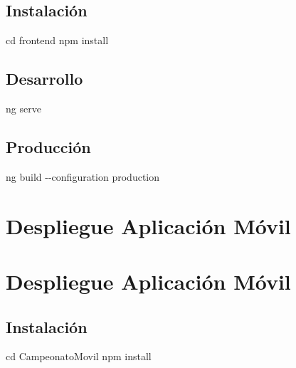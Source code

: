 \documentclass[
  spanish,
  11pt,
  letterpaper,
]{book}
\newenvironment{Shaded}{\begin{snugshade}}{\end{snugshade}}
\newcommand{\AttributeTok}[1]{\textcolor[rgb]{0.40,0.45,0.13}{#1}}
\newcommand{\BuiltInTok}[1]{\textcolor[rgb]{0.00,0.23,0.31}{#1}}
\newcommand{\ExtensionTok}[1]{\textcolor[rgb]{0.00,0.23,0.31}{#1}}
\newcommand{\NormalTok}[1]{\textcolor[rgb]{0.00,0.23,0.31}{#1}}
\begin{document}
\section{Instalación}\label{instalaciuxf3n-1}

\begin{Shaded}
\begin{Highlighting}[]
\BuiltInTok{cd}\NormalTok{ frontend}
\ExtensionTok{npm}\NormalTok{ install}
\end{Highlighting}
\end{Shaded}

\section{Desarrollo}\label{desarrollo}

\begin{Shaded}
\begin{Highlighting}[]
\ExtensionTok{ng}\NormalTok{ serve}
\end{Highlighting}
\end{Shaded}

\section{Producción}\label{producciuxf3n}

\begin{Shaded}
\begin{Highlighting}[]
\ExtensionTok{ng}\NormalTok{ build }\AttributeTok{{-}{-}configuration}\NormalTok{ production}
\end{Highlighting}
\end{Shaded}

\chapter{Despliegue Aplicación
Móvil}\label{despliegue-aplicaciuxf3n-muxf3vil}

\chapter{Despliegue Aplicación
Móvil}\label{despliegue-aplicaciuxf3n-muxf3vil-1}

\section{Instalación}\label{instalaciuxf3n-2}

\begin{Shaded}
\begin{Highlighting}[]
\BuiltInTok{cd}\NormalTok{ CampeonatoMovil}
\ExtensionTok{npm}\NormalTok{ install}
\end{Highlighting}
\end{Shaded}
\end{document}
